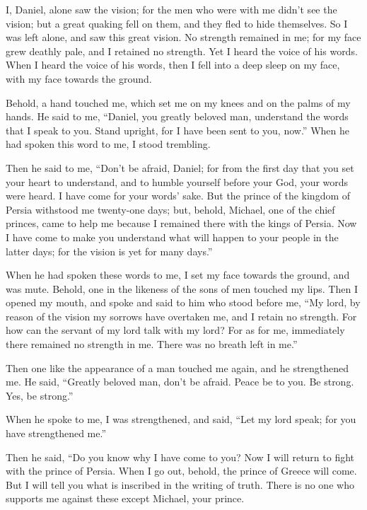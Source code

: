  I, Daniel, alone saw the vision; for the men who were with
me didn't see the vision; but a great quaking fell on them, and they
fled to hide themselves.  So I was left alone, and saw this
great vision. No strength remained in me; for my face grew deathly pale,
and I retained no strength.  Yet I heard the voice of his
words. When I heard the voice of his words, then I fell into a deep
sleep on my face, with my face towards the ground.

 Behold, a hand touched me, which set me on my knees and on
the palms of my hands.  He said to me, ``Daniel, you
greatly beloved man, understand the words that I speak to you. Stand
upright, for I have been sent to you, now.'' When he had spoken this
word to me, I stood trembling.

 Then he said to me, ``Don't be afraid, Daniel; for from
the first day that you set your heart to understand, and to humble
yourself before your God, your words were heard. I have come for your
words' sake.  But the prince of the kingdom of Persia
withstood me twenty-one days; but, behold, Michael, one of the chief
princes, came to help me because I remained there with the kings of
Persia.  Now I have come to make you understand what will
happen to your people in the latter days; for the vision is yet for many
days.''

 When he had spoken these words to me, I set my face
towards the ground, and was mute.  Behold, one in the
likeness of the sons of men touched my lips. Then I opened my mouth, and
spoke and said to him who stood before me, ``My lord, by reason of the
vision my sorrows have overtaken me, and I retain no strength.
 For how can the servant of my lord talk with my lord? For
as for me, immediately there remained no strength in me. There was no
breath left in me.''

 Then one like the appearance of a man touched me again,
and he strengthened me.  He said, ``Greatly beloved man,
don't be afraid. Peace be to you. Be strong. Yes, be strong.''

When he spoke to me, I was strengthened, and said, ``Let my lord speak;
for you have strengthened me.''

 Then he said, ``Do you know why I have come to you? Now I
will return to fight with the prince of Persia. When I go out, behold,
the prince of Greece will come.  But I will tell you what
is inscribed in the writing of truth. There is no one who supports me
against these except Michael, your prince.

